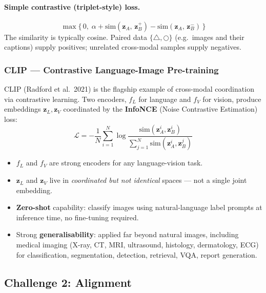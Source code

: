 \documentclass[11pt,a4paper]{article}
\theoremstyle{definition}
\theoremstyle{plain}
\theoremstyle{remark}
\begin{document}
\paragraph{Simple contrastive (triplet-style) loss.}
\[
    \max\bigl\{\,0,\; \alpha + \mathrm{sim}(\mathbf{z}_A,\, \mathbf{z}_B^+) - \mathrm{sim}(\mathbf{z}_A,\, \mathbf{z}_B^-)\,\bigr\}
\]
The similarity is typically cosine. Paired data $\{\triangle, \bigcirc\}$ (e.g.\ images and their captions) supply positives; unrelated cross-modal samples supply negatives.

\subsubsection{CLIP --- Contrastive Language-Image Pre-training}

CLIP (Radford et al.\ 2021) is the flagship example of cross-modal coordination via contrastive learning. Two encoders, $f_L$ for language and $f_V$ for vision, produce embeddings $\mathbf{z}_L, \mathbf{z}_V$ coordinated by the \textbf{InfoNCE} (Noise Contrastive Estimation) loss:
\[
    \mathcal{L} = -\frac{1}{N}\sum_{i=1}^{N} \log \frac{\mathrm{sim}(\mathbf{z}_A^i, \mathbf{z}_B^i)}{\sum_{j=1}^{N} \mathrm{sim}(\mathbf{z}_A^i, \mathbf{z}_B^j)}
\]

\begin{tcolorbox}[colback=blue!5!white, colframe=blue!60!black, title={Key properties of CLIP}]
\begin{itemize}
    \item $f_L$ and $f_V$ are strong encoders for any language-vision task.
    \item $\mathbf{z}_L$ and $\mathbf{z}_V$ live in \emph{coordinated but not identical} spaces --- not a single joint embedding.
    \item \textbf{Zero-shot} capability: classify images using natural-language label prompts at inference time, no fine-tuning required.
    \item Strong \textbf{generalisability}: applied far beyond natural images, including medical imaging (X-ray, CT, MRI, ultrasound, histology, dermatology, ECG) for classification, segmentation, detection, retrieval, VQA, report generation.
\end{itemize}
\end{tcolorbox}

\subsection{Challenge 2: Alignment}
\end{document}
